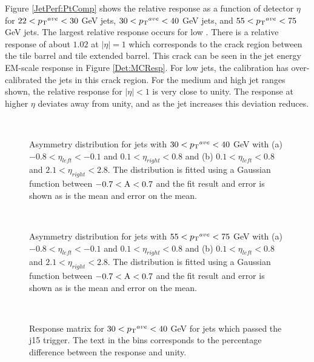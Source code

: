 Figure \ref{JetPerf:PtComp} shows the relative response as a function of detector $\eta$ for $22<\mbox{$\mbox{$p_{\rm T}$}{}^{ave}$}{}<30$ GeV jets, $30<\ptave{}<40$ GeV jets, and $55<\ptave{}<75$ GeV jets. 
The largest relative response occurs for low \ptave{}.
There is a relative response of about $1.02$ at $|\eta|=1$ which corresponds to the crack region between the tile barrel and tile extended barrel. 
This crack can be seen in the jet energy EM-scale response in Figure \ref{Det:MCResp}.
For low \pt{} jets, the calibration has over-calibrated the jets in this crack region. 
For the medium and high jet \pt{} ranges shown, the relative response for $|\eta|<1$ is very close to unity.
The response at higher $\eta{}$ deviates away from unity, and as the jet \pt{} increases this deviation reduces. 

\begin{figure}
\centering
\mbox{
}
\caption[Example asymmetry distribution for jets with $30<\ptave{}<40$ GeV]{
Asymmetry distribution for jets with $30<\ptave{}<40$ GeV with (a) $-0.8<\eta_{left}<-0.1$ and $0.1<\eta_{right}<0.8$ and (b)  $0.1<\eta_{left}<0.8$ and $2.1<\eta_{right}<2.8$.
The distribution is fitted using a Gaussian function between $\rm{-0.7<A<0.7}$ and the fit result and error is shown as is the mean and error on the mean. 
\label{JetPerf:Asym_j15}}
\end{figure}

\begin{figure}
\centering
\mbox{
}
\caption[Example asymmetry distribution for jets with $55<\ptave{}<75$ GeV]{
Asymmetry distribution for jets with $55<\ptave{}<75$ GeV with (a) $-0.8<\eta_{left}<-0.1$ and $0.1<\eta_{right}<0.8$ and (b)  $0.1<\eta_{left}<0.8$ and $2.1<\eta_{right}<2.8$.
The distribution is fitted using a Gaussian function between $\rm{-0.7<A<0.7}$ and the fit result and error is shown as is the mean and error on the mean. 
\label{JetPerf:Asym_j30}}
\end{figure}

\begin{figure}
\centering
\mbox{
}
\caption[The response matrix for jets with $30<\ptave{}<40$ GeV]{
Response matrix for $30<\ptave{}<40$ GeV for jets which passed the j15 trigger. 
The text in the bins corresponds to the percentage difference between the response and unity.
\label{JetPerf:ResponseMatrix_30_40_j15}}
\end{figure}

